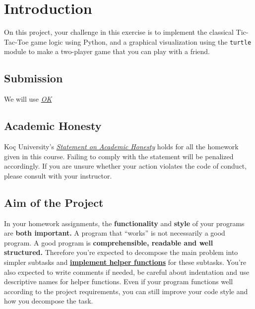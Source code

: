 \documentclass[a4paper]{article}
\author{Hasan Can Aslan}
\title{\projectTitle}
\date{Submission Date: \projectDate}
\newcommand{\projectTitle}{Tic-Tac-Toe}
\newcommand{\assignmentNumber}{1}
\begin{document}
\maketitle

\lstset{language=Python}
\pagestyle{fancy}
\fancyhf{}
\chead{\projectTitle}
\rhead{Assignment \#\assignmentNumber}
\lfoot{\nouppercase{\leftmark}}
\thispagestyle{fancy}
\renewcommand{\headrulewidth}{0.4pt}
\renewcommand{\footrulewidth}{0.4pt}


\section{Introduction}

On this project, your challenge in this exercise is to implement the classical Tic-Tac-Toe game logic using Python, and a graphical visualization using the \texttt{turtle} module to make a two-player game that you can play with a friend.

\subsection{Submission}
We will use \emph{\href{https://okpy.org}{OK}}

\subsection{Academic Honesty}
Koç University's \emph{\href{https://vpaa.ku.edu.tr/sites/vpaa.ku.edu.tr/files/Misc_Documents/Statement_on_Academic_Honesty.pdf}{Statement on Academic Honesty}} holds for all the homework given in this course. Failing to comply with the statement will be penalized accordingly. If you are unsure whether your action violates the code of conduct, please consult with your instructor.

\subsection{Aim of the Project}
In your homework assignments, the \textbf{functionality} and \textbf{style} of your programs are \textbf{both important.}  A program that “works” is not necessarily a good program. A good program is \textbf{comprehensible, readable and well structured.} Therefore you’re expected to decompose the main problem into simpler subtasks and \underline{\textbf{implement helper functions}} for these subtasks. You’re also expected to write comments if needed, be careful about indentation and use descriptive names for helper functions. Even if your program functions well according to the project requirements, you can still improve your code style and how you decompose the task.
\end{document}
